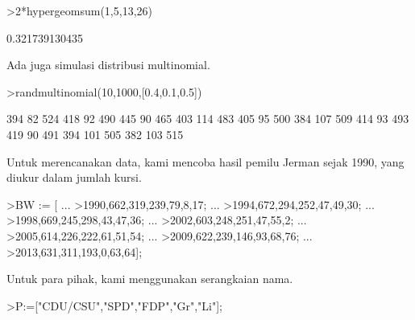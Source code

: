 \documentclass[a4paper,10pt]{article}
\begin{document}
\begin{eulernotebook}
\begin{eulercomment}
\begin{eulercomment}
\begin{eulercomment}
\begin{eulercomment}
\begin{eulercomment}
\begin{eulercomment}
\begin{eulercomment}
\begin{eulercomment}
\begin{eulercomment}
\begin{eulercomment}
\begin{eulercomment}
\begin{eulercomment}
\begin{eulercomment}
\begin{eulercomment}
\begin{eulercomment}
\begin{eulercomment}
\begin{eulercomment}
\begin{eulercomment}
\begin{eulercomment}
\begin{eulercomment}
\begin{eulercomment}
\begin{eulercomment}
\begin{eulercomment}
\begin{eulercomment}
\begin{eulercomment}
\begin{eulercomment}
\begin{eulercomment}
\begin{eulercomment}
\begin{eulercomment}
\begin{eulercomment}
\begin{eulercomment}
\begin{eulercomment}
\begin{eulerprompt}
>2*hypergeomsum(1,5,13,26)
\end{eulerprompt}
\begin{euleroutput}
  0.321739130435
\end{euleroutput}
\begin{eulercomment}
Ada juga simulasi distribusi multinomial.
\end{eulercomment}
\begin{eulerprompt}
>randmultinomial(10,1000,[0.4,0.1,0.5])
\end{eulerprompt}
\begin{euleroutput}
            394            82           524 
            418            92           490 
            445            90           465 
            403           114           483 
            405            95           500 
            384           107           509 
            414            93           493 
            419            90           491 
            394           101           505 
            382           103           515 
\end{euleroutput}
\begin{eulercomment}
Untuk merencanakan data, kami mencoba hasil pemilu Jerman sejak 1990,
yang diukur dalam jumlah kursi.
\end{eulercomment}
\begin{eulerprompt}
>BW := [ ...
>1990,662,319,239,79,8,17; ...
>1994,672,294,252,47,49,30; ...
>1998,669,245,298,43,47,36; ...
>2002,603,248,251,47,55,2; ...
>2005,614,226,222,61,51,54; ...
>2009,622,239,146,93,68,76; ...
>2013,631,311,193,0,63,64];
\end{eulerprompt}
\begin{eulercomment}
Untuk para pihak, kami menggunakan serangkaian nama.
\end{eulercomment}
\begin{eulerprompt}
>P:=["CDU/CSU","SPD","FDP","Gr","Li"];

\end{eulerprompt}
\end{eulercomment}
\end{eulercomment}
\end{eulercomment}
\end{eulercomment}
\end{eulercomment}
\end{eulercomment}
\end{eulercomment}
\end{eulercomment}
\end{eulercomment}
\end{eulercomment}
\end{eulercomment}
\end{eulercomment}
\end{eulercomment}
\end{eulercomment}
\end{eulercomment}
\end{eulercomment}
\end{eulercomment}
\end{eulercomment}
\end{eulercomment}
\end{eulercomment}
\end{eulercomment}
\end{eulercomment}
\end{eulercomment}
\end{eulercomment}
\end{eulercomment}
\end{eulercomment}
\end{eulercomment}
\end{eulercomment}
\end{eulercomment}
\end{eulercomment}
\end{eulercomment}
\end{eulercomment}
\end{eulernotebook}
\end{document}
